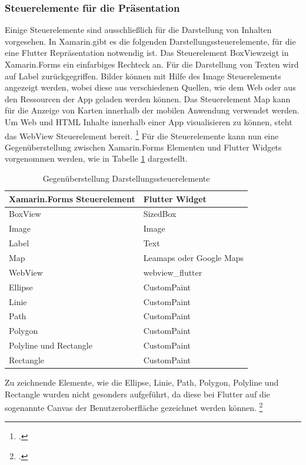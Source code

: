 \subsubsection{Steuerelemente für die Präsentation}
Einige Steuerelemente sind ausschließlich für die Darstellung von Inhalten vorgesehen.  In Xamarin.\@Forms gibt es die folgenden  Darstellungssteuerelemente, für die eine Flutter Repräsentation notwendig ist.  Das Steuerelement \glq BoxView\grq{}zeigt in Xamarin.Forms ein einfarbiges Rechteck an.  Für die Darstellung von Texten wird auf \glq Label\grq{} zurückgegriffen.  Bilder können mit Hilfe des \glq Image\grq{}  Steuerelements angezeigt werden,  wobei diese aus verschiedenen Quellen, wie dem Web oder aus den Ressourcen der App geladen werden können.  Das Steuerelement \glq Map\grq{}  kann für die Anzeige von Karten innerhalb der mobilen Anwendung verwendet werden.  Um Web und HTML Inhalte innerhalb einer App visualisieren zu können, steht das \glq WebView\grq{}  Steuerelement bereit.  \footcite[Vgl.][Abgerufen am \today]{MicrosoftXamLayouts2018} Für die Steuerelemente kann nun eine Gegenüberstellung zwischen Xamarin.Forms Elementen und Flutter Widgets vorgenommen werden,  wie in Tabelle \ref{tab:ControlsVisualization} dargestellt.

\begin{table}[!ht]
\begin{tabularx}{\textwidth}{X|X}
   \textbf{Xamarin.Forms Steuerelement} & \textbf{Flutter Widget}  \\
\hline
	BoxView		       			&   	 SizedBox  		\\ 
	Image       						&	     Image	 			\\ 
	Label       						&  	Text 					\\ 
	Map            					&	   	Leamaps oder Google Maps \\ 
	WebView            			&  	webview\_flutter	\\ 
	Ellipse							&  	CustomPaint	\\ 
	Linie								&	  	CustomPaint	\\ 
	Path  							&  	CustomPaint	\\ 
	Polygon  						&  	CustomPaint	\\ 
	Polyline und Rectangle  &  	CustomPaint	\\ 
	Rectangle  					&  	CustomPaint	\\ 

\end{tabularx}
\caption{Gegenüberstellung Darstellungssteuerelemente}
 \label{tab:ControlsVisualization}
\end{table}
Zu zeichnende Elemente, wie die  \glq Ellipse\grq{}, \glq Linie\grq{}, \glq Path\grq{},  \glq Polygon\grq{},  \glq Polyline\grq{}  und \glq Rectangle\grq{} wurden nicht gesonders aufgeführt,  da diese bei Flutter auf die sogenannte Canvas der Benutzeroberfläche gezeichnet werden können.  \footcite[Vgl.][Abgerufen am \today]{GoogleFlutterCanvas2020} 

